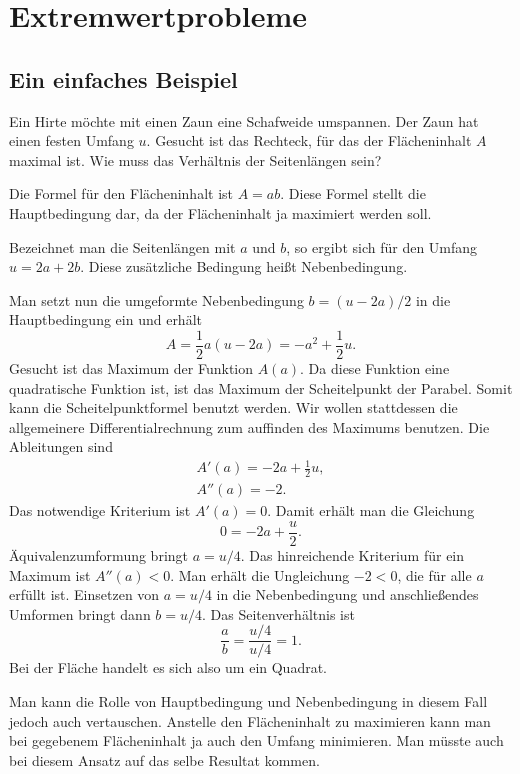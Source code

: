 \documentclass[a4paper,11pt,fleqn,twocolumn]{article}
\begin{document}

\section*{Extremwertprobleme}


\subsection*{Ein einfaches Beispiel}

Ein Hirte möchte mit einen Zaun eine Schafweide umspannen.
Der Zaun hat einen festen Umfang \(u\). Gesucht ist das Rechteck,
für das der Flächeninhalt \(A\) maximal ist. Wie muss das Verhältnis
der Seitenlängen sein?

Die Formel für den Flächeninhalt ist \(A=ab\). Diese Formel stellt
die Hauptbedingung dar, da der Flächeninhalt ja maximiert werden soll.

Bezeichnet man die Seitenlängen mit \(a\) und \(b\), so ergibt sich
für den Umfang \(u=2a+2b\). Diese zusätzliche Bedingung heißt
Nebenbedingung.

Man setzt nun die umgeformte Nebenbedingung \(b=(u-2a)/2\) in die
Hauptbedingung ein und erhält
\[A = \frac{1}{2}a(u-2a) = -a^2+\frac{1}{2}u.\]
Gesucht ist das Maximum der Funktion \(A(a)\). Da diese Funktion
eine quadratische Funktion ist, ist das Maximum der Scheitelpunkt
der Parabel. Somit kann die Scheitelpunktformel benutzt werden.
Wir wollen stattdessen die allgemeinere Differentialrechnung zum
auffinden des Maximums benutzen. Die Ableitungen sind
\begin{gather*}
A'(a) = -2a+\frac{1}{2}u,\\
A''(a) = -2.
\end{gather*}
Das notwendige Kriterium ist \(A'(a)=0\). Damit erhält  man die
Gleichung
\[0=-2a+\frac{u}{2}.\]
Äquivalenzumformung bringt \(a=u/4\). Das hinreichende Kriterium
für ein Maximum ist \(A''(a)<0\). Man erhält die Ungleichung \(-2<0\),
die für alle \(a\) erfüllt ist. Einsetzen von \(a=u/4\) in die Nebenbedingung
und anschließendes Umformen bringt dann \(b=u/4\). Das Seitenverhältnis
ist
\[\frac{a}{b} = \frac{u/4}{u/4} = 1.\]
Bei der Fläche handelt es sich also um ein Quadrat.

Man kann die Rolle von Hauptbedingung und Nebenbedingung in diesem
Fall jedoch auch vertauschen. Anstelle den Flächeninhalt zu maximieren
kann man bei gegebenem Flächeninhalt ja auch den Umfang minimieren.
Man müsste auch bei diesem Ansatz auf das selbe Resultat kommen.
\end{document}
